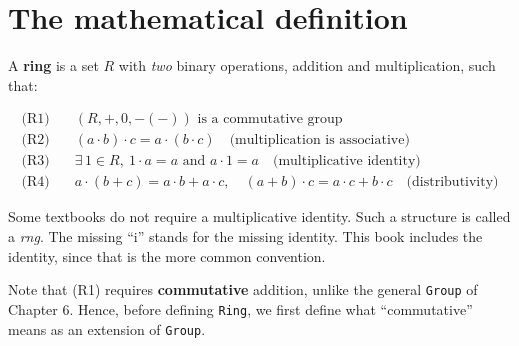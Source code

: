 \section{The mathematical definition}\label{sec:08-rings:01-definition:1}

A \textbf{ring} is a set \(R\) with \emph{two} binary operations, addition and multiplication, such that:

\[
\begin{aligned}
\text{(R1)}&\quad (R, +, 0, -(-)) \text{ is a commutative group} \\
\text{(R2)}&\quad (a \cdot b) \cdot c = a \cdot (b \cdot c) \quad \text{(multiplication is associative)} \\
\text{(R3)}&\quad \exists\, 1 \in R,\ 1 \cdot a = a \text{ and } a \cdot 1 = a \quad \text{(multiplicative identity)} \\
\text{(R4)}&\quad a \cdot (b + c) = a \cdot b + a \cdot c, \quad (a + b) \cdot c = a \cdot c + b \cdot c \quad \text{(distributivity)}
\end{aligned}
\]

Some textbooks do not require a multiplicative identity. Such a structure is called a \emph{rng}. The missing ``i'' stands for the missing identity. This book includes the identity, since that is the more common convention.

Note that (R1) requires \textbf{commutative} addition, unlike the general \texttt{Group} of Chapter 6. Hence, before defining \texttt{Ring}, we first define what ``commutative'' means as an extension of \texttt{Group}.
